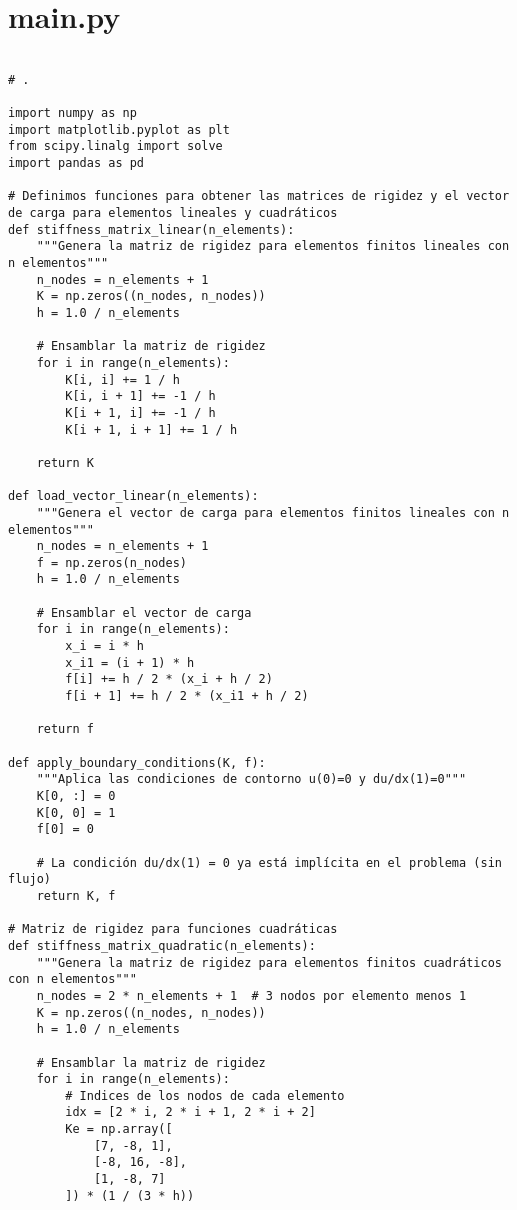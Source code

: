 \chapter{main.py}\label{apendice:a}

\begin{verbatim}

# .

import numpy as np
import matplotlib.pyplot as plt
from scipy.linalg import solve
import pandas as pd

# Definimos funciones para obtener las matrices de rigidez y el vector de carga para elementos lineales y cuadráticos
def stiffness_matrix_linear(n_elements):
    """Genera la matriz de rigidez para elementos finitos lineales con n elementos"""
    n_nodes = n_elements + 1
    K = np.zeros((n_nodes, n_nodes))
    h = 1.0 / n_elements
    
    # Ensamblar la matriz de rigidez
    for i in range(n_elements):
        K[i, i] += 1 / h
        K[i, i + 1] += -1 / h
        K[i + 1, i] += -1 / h
        K[i + 1, i + 1] += 1 / h
    
    return K

def load_vector_linear(n_elements):
    """Genera el vector de carga para elementos finitos lineales con n elementos"""
    n_nodes = n_elements + 1
    f = np.zeros(n_nodes)
    h = 1.0 / n_elements
    
    # Ensamblar el vector de carga
    for i in range(n_elements):
        x_i = i * h
        x_i1 = (i + 1) * h
        f[i] += h / 2 * (x_i + h / 2)
        f[i + 1] += h / 2 * (x_i1 + h / 2)
    
    return f

def apply_boundary_conditions(K, f):
    """Aplica las condiciones de contorno u(0)=0 y du/dx(1)=0"""
    K[0, :] = 0
    K[0, 0] = 1
    f[0] = 0
    
    # La condición du/dx(1) = 0 ya está implícita en el problema (sin flujo)
    return K, f

# Matriz de rigidez para funciones cuadráticas
def stiffness_matrix_quadratic(n_elements):
    """Genera la matriz de rigidez para elementos finitos cuadráticos con n elementos"""
    n_nodes = 2 * n_elements + 1  # 3 nodos por elemento menos 1
    K = np.zeros((n_nodes, n_nodes))
    h = 1.0 / n_elements

    # Ensamblar la matriz de rigidez
    for i in range(n_elements):
        # Indices de los nodos de cada elemento
        idx = [2 * i, 2 * i + 1, 2 * i + 2]
        Ke = np.array([
            [7, -8, 1],
            [-8, 16, -8],
            [1, -8, 7]
        ]) * (1 / (3 * h))


\end{verbatim}
